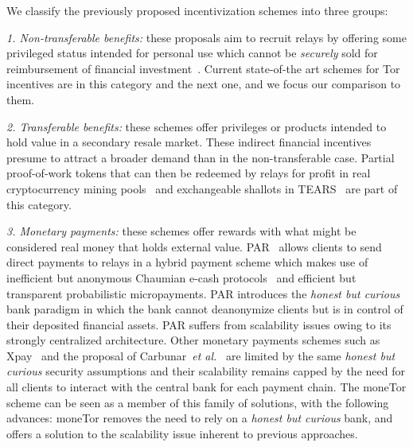 We classify the previously proposed incentivization schemes into three groups:

\noindent \emph{1. Non-transferable benefits:} these proposals aim to recruit
relays by offering some privileged status intended for personal use which cannot
be \emph{securely} sold for reimbursement of financial
investment~\cite{dingledine2010building,jansen2010recruiting, jansen2013lira}.
Current state-of-the art schemes for Tor incentives are in this category and the
next one, and we focus our comparison to them.
	  
\noindent \emph{2. Transferable benefits:} these schemes offer privileges or
products intended to hold value in a secondary resale market. These indirect
financial incentives presume to attract a broader demand than in the
non-transferable case. Partial proof-of-work tokens that can then be redeemed by
relays for profit in real cryptocurrency mining pools~\cite{biryukov2015proof}
and exchangeable shallots in TEARS~\cite{jansen2014onions} are part of this
category.

\noindent \emph{3. Monetary payments:} these schemes offer rewards with what
might be considered real money that holds external value.
PAR~\cite{androulaki2008payment} allows clients to send direct payments to
relays in a hybrid payment scheme which makes use of inefficient but anonymous
Chaumian e-cash protocols~\cite{chaum1988untraceable} and efficient but
transparent probabilistic micropayments. PAR introduces the \emph{honest but
  curious} bank paradigm in which the bank cannot deanonymize clients but is in
control of their deposited financial assets. PAR suffers from scalability issues
owing to its strongly centralized architecture. Other monetary payments schemes
such as Xpay~\cite{chen2009xpay} and the proposal of Carbunar~\textit{et
  al.}~\cite{carbunar2012tipping} are limited by the same \emph{honest but
  curious} security assumptions and their scalability remains capped by the need
for all clients to interact with the central bank for each payment chain. The
moneTor scheme can be seen as a member of this family of solutions, with the
following advances: moneTor removes the need to rely on a \textit{honest but
  curious} bank, and offers a solution to the scalability issue inherent to
previous approaches.



